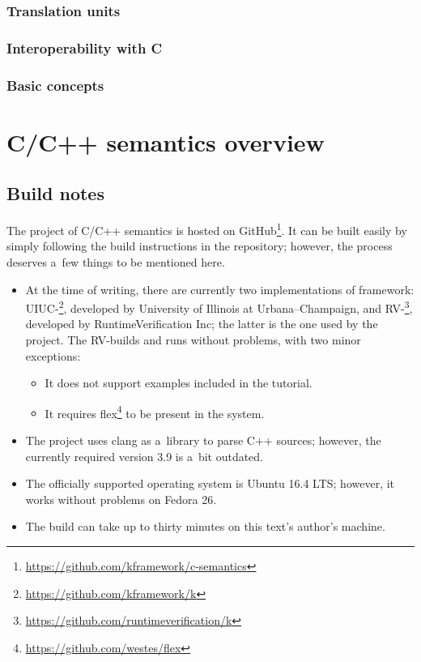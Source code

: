 \documentclass{fithesis3}
\begin{document}
\subsection{Translation units}

\subsection{Interoperability with C}

\subsection{Basic concepts}


\fi %

\chapter{\K C/C++ semantics overview}





\section{Build notes}
The project of \K C/C++ semantics is hosted on GitHub\footnote{\url{https://github.com/kframework/c-semantics}}. It can be built easily by simply following the build instructions in the repository; however, the process deserves a~few things to be mentioned here.

\begin{itemize}
\item At the time of writing, there are currently two implementations of \K framework: UIUC-\K\footnote{\url{https://github.com/kframework/k}}, developed by University of Illinois at Urbana–Champaign, and RV-\K\footnote{\url{https://github.com/runtimeverification/k}}, developed by RuntimeVerification Inc; the latter is the one used by the project. The RV-\K builds and runs without problems, with two minor exceptions:
\begin{itemize}
\item It does not support examples included in the \K tutorial.
\item It requires flex\footnote{\url{https://github.com/westes/flex}} to be present in the system.
\end{itemize}
\item The project uses clang as a~library to parse C++ sources; however, the currently required version 3.9 is a~bit outdated.
\item The officially supported operating system is Ubuntu 16.4 LTS; however, it works without problems on Fedora 26.
\item The build can take up to thirty minutes on this text's author's machine.
\end{itemize}
\end{document}
